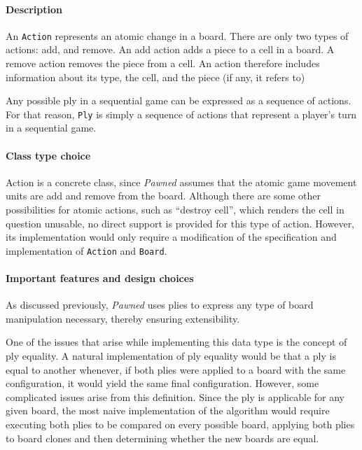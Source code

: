 				\paragraph{Description}	An \texttt{Action} represents an atomic change in a board. There are only 
																two types of actions: add, and remove. An add action adds a piece to a cell 
																in a board. A remove action removes the piece from a cell. An action therefore
																includes information about its type, the cell, and the piece (if any, it refers to)
																
																Any possible ply in a sequential game can be expressed as a sequence of actions. For 
																that reason, \texttt{Ply} is simply a sequence of actions that represent
																a player's turn in a sequential game.  
				\paragraph{Class type choice} 			
																Action is a concrete class, since \emph{Pawned} assumes that
																the atomic game movement units are add and remove from the board. 
																Although there are some other possibilities for atomic actions, such as 
																``destroy cell'', which renders the cell in question unusable, no direct support
																is provided for this type of action. However, its implementation would only require
																a modification of the specification and implementation of \texttt{Action} and 
																\texttt{Board}. 

	 			\paragraph{Important features and design choices} As discussed previously, \emph{Pawned} uses
	 								plies to express any type of board manipulation necessary, thereby ensuring extensibility.
	 								
	 								One of the issues that arise while implementing this data type is the concept of ply equality.
	 								A natural implementation of ply equality would be that a ply is equal to another whenever, if
	 								both plies were applied to a board with the same configuration, it would yield the same final 
	 								configuration. However, some complicated issues arise from this definition. Since the ply is
	 								applicable for any given board, the most naive implementation of the algorithm would require
	 								executing both plies to be compared on every possible board, applying both plies to board
	 								clones and then determining whether the new boards are equal.
	 								
